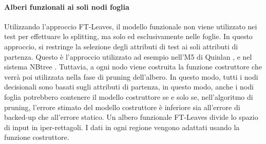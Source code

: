 
\paragraph{Alberi funzionali ai soli nodi foglia}
\label{Alberi funzionali ai soli nodi foglia}
Utilizzando l'approccio FT-Leaves, il modello funzionale non viene utilizzato nei test per effettuare lo splitting, ma solo ed esclusivamente nelle foglie. In questo approccio, si restringe la selezione degli attributi di test ai soli attributi di partenza.
Questo è l'approccio utilizzato ad esempio nell'M5 di Quinlan \cite{DBLP:conf/icml/Quinlan93}, e nel sistema NBtree \cite{Kohavi1996}. 
Tuttavia, a ogni nodo viene costruita la funzione costruttore che verrà poi utilizzata nella fase di pruning dell'albero. In questo modo, tutti i nodi decisionali sono basati sugli attributi di partenza, in questo modo, anche i nodi foglia potrebbero contenere il modello costruttore se e solo se, nell'algoritmo di pruning, l'errore stimato del modello costruttore è inferiore sia all'errore di backed-up che all'errore statico. Un albero funzionale FT-Leaves divide lo spazio di input in iper-rettagoli. I dati in ogni regione vengono adattati usando la funzione costruttore.

